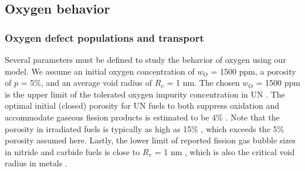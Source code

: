 \documentclass[preprint,12pt,sort&compress]{elsarticle}
\newcommand{\?}{\stackrel{?}{=}}
\begin{document}

\subsection{Oxygen behavior}
\label{Sec:Oxygen}

\subsubsection{Oxygen defect populations and transport}

Several parameters must be defined to study the behavior of oxygen using our model. We assume an initial oxygen concentration of $w_\text{O}$ = 1500 ppm, a porosity of $p$ = 5\%, and an average void radius of $R_v$ = 1 nm. The chosen $w_\text{O}$ = 1500 ppm is the upper limit of the tolerated oxygen impurity concentration in UN \cite{Rogozkin2003, Schuler2017}. The optimal initial (closed) porosity for UN fuels to both suppress oxidation and accommodate gaseous fission products is estimated to be 4\% \cite{Johnson2018}. Note that the porosity in irradiated fuels is typically as high as 15\% \cite{Nichenko2014}, which exceeds the 5\% porosity assumed here. Lastly, the lower limit of reported fission gas bubble sizes in nitride and carbide fuels is close to $R_v$ = 1 nm \cite{Matzke1986}, which is also the critical void radius in metals \cite{Zinkle1987b}.
\end{document}
